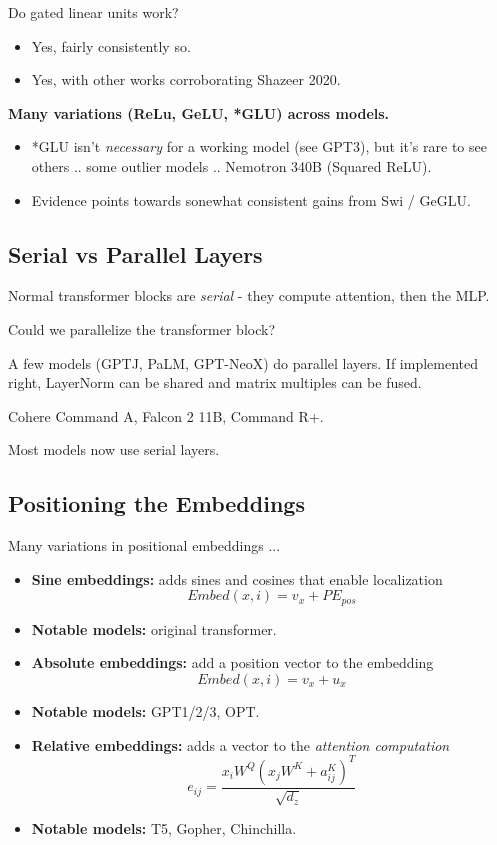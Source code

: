 \documentclass[12pt,twoside]{article}
\begin{document}
Do gated linear units work?

\begin{itemize}
    \item Yes, fairly consistently so.
    \item Yes, with other works corroborating Shazeer 2020.
\end{itemize}

\textbf{Many variations (ReLu, GeLU, *GLU) across models.}

\begin{itemize}
    \item*GLU isn't \textit{necessary} for a working model (see GPT3), but it's rare to see others .. some outlier models .. Nemotron 340B (Squared ReLU).
    \item Evidence points towards sonewhat consistent gains from Swi / GeGLU.
\end{itemize}

\subsection*{Serial vs Parallel Layers}

Normal transformer blocks are \textit{serial} - they compute attention, then the MLP.

\begin{question}
    Could we parallelize the transformer block?
\end{question}

A few models (GPTJ, PaLM, GPT-NeoX) do parallel layers. If implemented right, LayerNorm can be shared and matrix multiples can be fused.

\begin{claim}
    Cohere Command A, Falcon 2 11B, Command R+.
\end{claim}

Most models now use serial layers.

\subsection*{Positioning the Embeddings}

Many variations in positional embeddings ...

\begin{itemize}
    \item \textbf{Sine embeddings:} adds sines and cosines that enable localization
    \[
        Embed(x, i) = v_x + PE_{pos}
    \]
    \item \textbf{Notable models:} original transformer.
    \item \textbf{Absolute embeddings:} add a position vector to the embedding
    \[
        Embed(x, i) = v_x + u_x
    \]
    \item \textbf{Notable models:} GPT1/2/3, OPT.
    \item \textbf{Relative embeddings:} adds a vector to the \textit{attention computation}
    \[
        e_{ij} = \frac{x_iW^Q(x_jW^K + a_{ij}^K)^T}{\sqrt{d_z}}
    \]
    \item \textbf{Notable models:} T5, Gopher, Chinchilla. 
\end{itemize}
\end{document}
